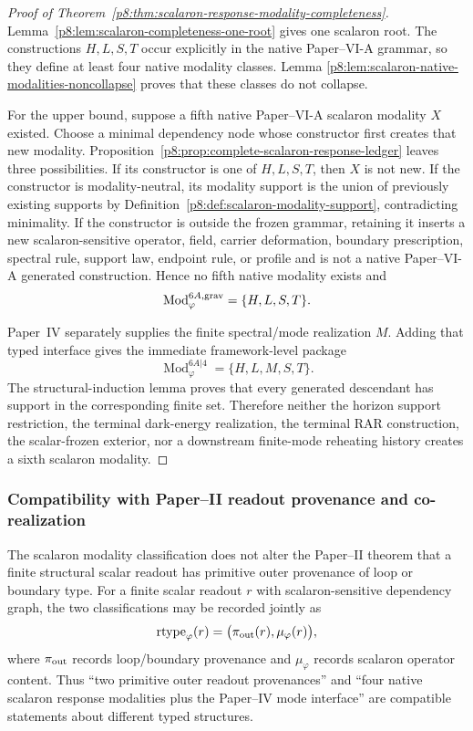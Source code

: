 \documentclass[12pt,a4paper]{article}
\begin{document}
\begin{proof}[Proof of Theorem~\ref{p8:thm:scalaron-response-modality-completeness}]
Lemma~\ref{p8:lem:scalaron-completeness-one-root} gives one scalaron root.
The constructions $H,L,S,T$ occur explicitly in the native Paper--VI-A grammar,
so they define at least four native modality classes.  Lemma
\ref{p8:lem:scalaron-native-modalities-noncollapse} proves that these classes do
not collapse.

For the upper bound, suppose a fifth native Paper--VI-A scalaron modality
$X$ existed.  Choose a minimal dependency node whose constructor first creates
that new modality.  Proposition~\ref{p8:prop:complete-scalaron-response-ledger}
leaves three possibilities.  If its constructor is one of $H,L,S,T$, then $X$
is not new.  If the constructor is modality-neutral, its modality support is
the union of previously existing supports by
Definition~\ref{p8:def:scalaron-modality-support}, contradicting minimality.  If
the constructor is outside the frozen grammar, retaining it inserts a new
scalaron-sensitive operator, field, carrier deformation, boundary prescription,
spectral rule, support law, endpoint rule, or profile and is not a native
Paper--VI-A generated construction.  Hence no fifth native modality exists and
\[
    \operatorname{Mod}^{6A,\rm grav}_{\varphi}=\{H,L,S,T\}.
\]

Paper~IV separately supplies the finite spectral/mode realization $M$.  Adding
that typed interface gives the immediate framework-level package
\[
    \operatorname{Mod}^{6A|4}_{\varphi}=\{H,L,M,S,T\}.
\]
The structural-induction lemma proves that every generated descendant has
support in the corresponding finite set.  Therefore neither the horizon
support restriction, the terminal dark-energy realization, the terminal RAR
construction, the scalar-frozen exterior, nor a downstream finite-mode
reheating history creates a sixth scalaron modality. \qedhere
\end{proof}

\subsubsection{Compatibility with Paper--II readout provenance and co-realization}

\begin{corollary}
\label{p8:cor:scalaron-modality-vs-readout-provenance}
The scalaron modality classification does not alter the Paper--II theorem that
a finite structural scalar readout has primitive outer provenance of loop or
boundary type.  For a finite scalar readout $r$ with scalaron-sensitive
dependency graph, the two classifications may be recorded jointly as
\[
    \operatorname{rtype}_{\varphi}(r)
    =
    \bigl(\pi_{\rm out}(r),\mu_{\varphi}(r)\bigr),
\]
where $\pi_{\rm out}$ records loop/boundary provenance and $\mu_{\varphi}$
records scalaron operator content.  Thus ``two primitive outer readout
provenances'' and ``four native scalaron response modalities plus the Paper--IV
mode interface'' are compatible statements about different typed structures.
\end{corollary}
\end{document}
